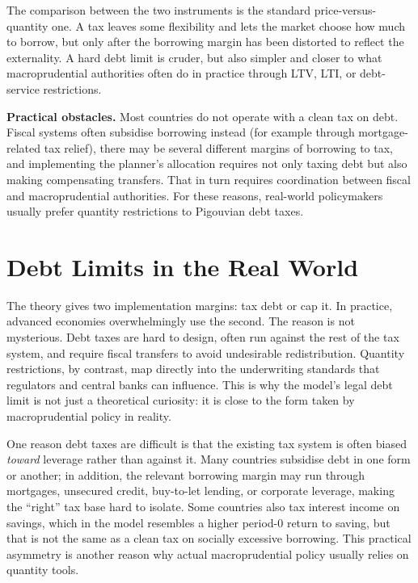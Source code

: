 \documentclass[11pt,a4paper]{article}
\begin{document}
The comparison between the two instruments is the standard price-versus-quantity one. A tax leaves some flexibility and lets the market choose how much to borrow, but only after the borrowing margin has been distorted to reflect the externality. A hard debt limit is cruder, but also simpler and closer to what macroprudential authorities often do in practice through LTV, LTI, or debt-service restrictions.

\textbf{Practical obstacles.} Most countries do not operate with a clean tax on debt. Fiscal systems often subsidise borrowing instead (for example through mortgage-related tax relief), there may be several different margins of borrowing to tax, and implementing the planner's allocation requires not only taxing debt but also making compensating transfers. That in turn requires coordination between fiscal and macroprudential authorities. For these reasons, real-world policymakers usually prefer quantity restrictions to Pigouvian debt taxes.


\section{Debt Limits in the Real World}\label{sec:debtlimits}

The theory gives two implementation margins: tax debt or cap it. In practice, advanced economies overwhelmingly use the second. The reason is not mysterious. Debt taxes are hard to design, often run against the rest of the tax system, and require fiscal transfers to avoid undesirable redistribution. Quantity restrictions, by contrast, map directly into the underwriting standards that regulators and central banks can influence. This is why the model's legal debt limit is not just a theoretical curiosity: it is close to the form taken by macroprudential policy in reality.

One reason debt taxes are difficult is that the existing tax system is often biased \textit{toward} leverage rather than against it. Many countries subsidise debt in one form or another; in addition, the relevant borrowing margin may run through mortgages, unsecured credit, buy-to-let lending, or corporate leverage, making the ``right'' tax base hard to isolate. Some countries also tax interest income on savings, which in the model resembles a higher period-0 return to saving, but that is not the same as a clean tax on socially excessive borrowing. This practical asymmetry is another reason why actual macroprudential policy usually relies on quantity tools.
\end{document}
